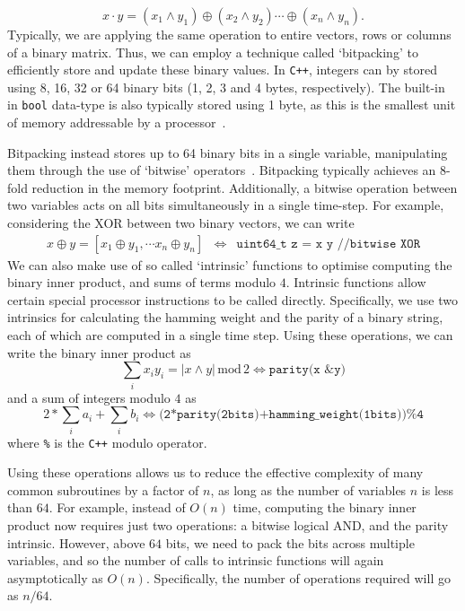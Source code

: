 \[x\cdot y = \left(x_{1}\wedge y_{1}\right)\oplus\left(x_{2}\wedge y_{2}\right)\cdots\oplus\left(x_{n}\wedge y_{n}\right).\]
Typically, we are applying the same operation to entire vectors, rows or columns of a binary matrix. Thus, we can employ a technique called `bitpacking' to efficiently store and update these binary values. In \texttt{C++}, integers can by stored using 8, 16, 32 or 64 binary bits (1, 2, 3 and 4 bytes, respectively). The built-in in \texttt{bool} data-type is also typically stored using 1 byte, as this is the smallest unit of memory addressable by a processor~\cite{CPPRefTypes}.\par
Bitpacking instead stores up to 64 binary bits in a single variable, manipulating them through the use of `bitwise' operators~\cite{CPPRefBitwise}. Bitpacking typically achieves an $8$-fold reduction in the memory footprint. Additionally, a bitwise operation between two variables acts on all bits simultaneously in a single time-step. For example, considering the XOR between two binary vectors, we can write
\[
\begin{array}{rcl}
x\oplus y = [x_{1}\oplus y_{1},\cdots x_{n}\oplus y_{n}] & \iff &
\texttt{uint64\_t z = x \^{} y //bitwise XOR}
\end{array}
\]
We can also make use of so called `intrinsic' functions to optimise computing the binary inner product, and sums of terms modulo $4$. Intrinsic functions allow certain special processor instructions to be called directly. Specifically, we use two intrinsics for calculating the hamming weight and the parity of a binary string, each of which are computed in a single time step. Using these operations, we can write the binary inner product as
\[\sum_{i}x_{i}y_{i} = \left\vert x\wedge y\right\vert\,\text{mod}\,2\iff \texttt{parity(x \& y)}\]
and a sum of integers modulo $4$ as
\[2*\sum_{i}a_{i}+\sum_{i}b_{i}\iff \texttt{(2*parity(2bits)+hamming\_weight(1bits))\%4}\]
where \texttt{\%} is the \texttt{C++} modulo operator.\par
Using these operations allows us to reduce the effective complexity of many common subroutines by a factor of $n$, as long as the number of variables $n$ is less than $64$. For example, instead of $O(n)$ time, computing the binary inner product now requires just two operations: a bitwise logical AND, and the parity intrinsic. However, above $64$ bits, we need to pack the bits across multiple variables, and so the number of calls to intrinsic functions will again asymptotically as $O(n)$. Specifically, the number of operations required will go as $n/64$.\par
